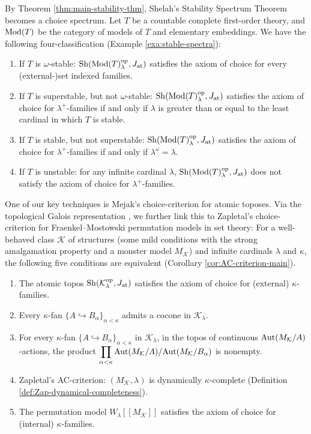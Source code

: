 \documentclass[10pt]{amsart}
\numberwithin{equation}{section}
\theoremstyle{plain}
\theoremstyle{definition}
\newcommand{\om}{\omega}
\newcommand{\K}{\mathcal{K}}
\newcommand{\embed}{\hookrightarrow}
\begin{document}

By Theorem \ref{thm:main-stability-thm}, Shelah's Stability Spectrum Theorem {\cite[Theorem III.5.15]{She90}} becomes a choice spectrum.
Let $T$ be a countable complete first-order theory, and ${\rm Mod}(T)$ be the category of models of $T$ and elementary embeddings.
We have the following four-classification (Example \ref{exa:stable-spectra}):
\begin{enumerate}
\item If $T$ is $\om$-stable:
${\rm Sh}({\rm Mod}(T)_\lambda^{\rm op},J_{\rm at})$ satisfies the axiom of choice for every (external-)set indexed families.
\item If $T$ is superstable, but not $\om$-stable:
${\rm Sh}({\rm Mod}(T)_\lambda^{\rm op},J_{\rm at})$ satisfies the axiom of choice for $\lambda^+$-families if and only if $\lambda$ is greater than or equal to the least cardinal in which $T$ is stable.
\item If $T$ is stable, but not superstable:
${\rm Sh}({\rm Mod}(T)_\lambda^{\rm op},J_{\rm at})$ satisfies the axiom of choice for $\lambda^+$-families if and only if $\lambda^\om=\lambda$.
\item If $T$ is unstable:
for any infinite cardinal $\lambda$, ${\rm Sh}({\rm Mod}(T)_\lambda^{\rm op},J_{\rm at})$ does not satisfy the axiom of choice for $\lambda^+$-families.
\end{enumerate}

One of our key techniques is Mejak's choice-criterion \cite{Mej19} for atomic toposes.
Via the topological Galois representation \cite{Car16,CaLa19}, we further link this to Zapletal's choice-criterion \cite{Zap26} for Fraenkel--Mostowski permutation models in set theory:
For a well-behaved class $\mathcal{K}$ of structures (some mild conditions with the strong amalgamation property and a monster model $M_\K$) and infinite cardinals $\lambda$ and $\kappa$, the following five conditions are equivalent (Corollary \ref{cor:AC-criterion-main}).
\begin{enumerate}
\item The atomic topos ${\rm Sh}(\K_\lambda^{\rm op},J_{\rm at})$ satisfies the axiom of choice for (external) $\kappa$-families.
\item Every $\kappa$-fan $\{A\embed B_\alpha\}_{\alpha<\kappa}$ admits a cocone in $\K_\lambda$. 
\item For every $\kappa$-fan $\{A\embed B_\alpha\}_{\alpha<\kappa}$ in $\K_\lambda$, in the topos of continuous ${\rm Aut}(M_\K/A)$-actions, the product 
$\displaystyle{\prod_{\alpha<\kappa}{\rm Aut}(M_\K/A)/{\rm Aut}(M_\K/B_\alpha)}$ is nonempty.
\item Zapletal's AC-criterion: $(M_\K,\lambda)$ is dynamically $\kappa$-complete (Definition \ref{def:Zap-dynamical-completeness}).
\item The permutation model $W_\lambda[[M_\K]]$ satisfies the axiom of choice for (internal) $\kappa$-families.
\end{enumerate}
\end{document}
